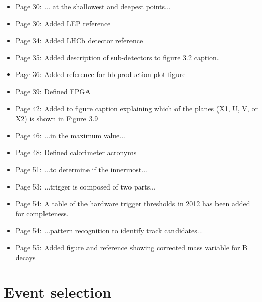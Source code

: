 \documentclass[12pt]{article}
\begin{document}
\begin{itemize}
\item Page 30: ... at the {\color{red}shallowest and deepest} points...
\item Page 30: Added LEP reference
\item Page 34: Added LHCb detector reference
\item Page 35: Added description of sub-detectors to figure 3.2 caption.
\item Page 36: Added reference for bb production plot figure
\item Page 39: Defined FPGA
\item Page 42: Added to figure caption explaining which of the planes (X1, U, V, or X2) is shown in Figure 3.9
\item Page 46: ...in the {\color{red}maximum} value...
\item Page 48: Defined calorimeter acronyms
\item Page 51: ...to determine {\color{red}if} the innermost...
\item Page 53: ...trigger is composed {\color{red}of} two parts...
\item Page 54: A table of the hardware trigger thresholds in 2012 has been added for completeness.
\item Page 54: ...pattern recognition {\color{red}to} identify track candidates...
\item Page 55: Added figure and reference showing corrected mass variable for B decays
\end{itemize}

\section{Event selection}
\end{document}
